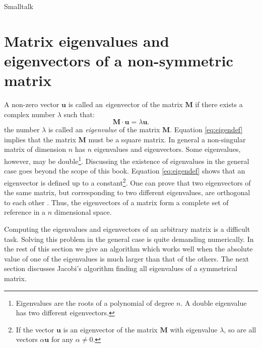 \begin{displaycode}{Smalltalk}
\section{Matrix eigenvalues and eigenvectors of a non-symmetric matrix}
\label{sec:eigen} A non-zero vector $\textbf{u}$ is called an {\textsl eigenvector} of the matrix $\textbf{M}$ if there exists a complex number $\lambda$ such that:
\begin{equation}
\label{eq:eigendef}
 \textbf{M}\cdot\textbf{u}=\lambda\textbf{u}.
\end{equation}
the number $\lambda$ is called an \textsl{eigenvalue} of the matrix
$\textbf{M}$. Equation \ref{eq:eigendef} implies that the matrix
$\textbf{M}$ must be a square matrix. In general a non-singular
matrix of dimension $n$ has $n$ eigenvalues and eigenvectors. Some
eigenvalues, however, may be double\footnote{Eigenvalues are the
roots of a polynomial of degree $n$. A double eigenvalue has two
different eigenvectors.}. Discussing the existence of eigenvalues
in the general case goes beyond the scope of this book. Equation
\ref{eq:eigendef} shows that an eigenvector is defined up to a
constant\footnote{If the vector $\textbf{u}$ is an eigenvector of the
matrix $\textbf{M}$ with eigenvalue $\lambda$, so are all vectors
$\alpha\textbf{u}$ for any $\alpha\ne 0$.}. One can prove that two
eigenvectors of the same matrix, but corresponding to two
different eigenvalues, are orthogonal to each other \cite{Bass}.
Thus, the eigenvectors of a matrix form a complete set of
reference in a $n$ dimensional space.

Computing the eigenvalues and eigenvectors of an arbitrary matrix
is a difficult task. Solving this problem in the general case is
quite demanding numerically. In the rest of this section we give
an algorithm which works well when the absolute value of one of
the eigenvalues is much larger than that of the others. The next
section discusses Jacobi's algorithm finding all eigenvalues of a
symmetrical matrix.


\end{displaycode}
